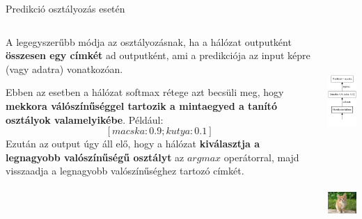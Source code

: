 \documentclass[english, aspectratio=169]{beamer}
\begin{document}
\begin{frame}{Predikció osztályozás esetén}
\begin{columns}
\begin{column}{.7\textwidth}
A legegyszerűbb módja az osztályozásnak, ha a hálózat outputként \textbf{összesen egy címkét} ad outputként, ami a predikciója az input képre (vagy adatra) vonatkozóan.\par\smallskip
Ebben az esetben a hálózat softmax rétege azt becsüli meg, hogy \textbf{mekkora válószínűséggel tartozik a mintaegyed a tanító osztályok valamelyikébe}. Például:
\[
\left[ macska: 0.9; kutya: 0.1 \right]
\]
Ezután az output úgy áll elő, hogy a hálózat \textbf{kiválasztja a legnagyobb valószínűségű osztályt} az $argmax$ operátorral, majd visszaadja a legnagyobb valószínűséghez tartozó címkét.
\end{column}
\begin{column}{.3\textwidth}
\begin{center}
\includegraphics[height=5cm, keepaspectratio]{graphs/od_1.png}\\
\vspace{-0.7cm}
\includegraphics[height=2.5cm, width=2.5cm, keepaspectratio]{images/od_1.png}
\end{center}
\end{column}
\end{columns}
\end{frame}
\end{document}
